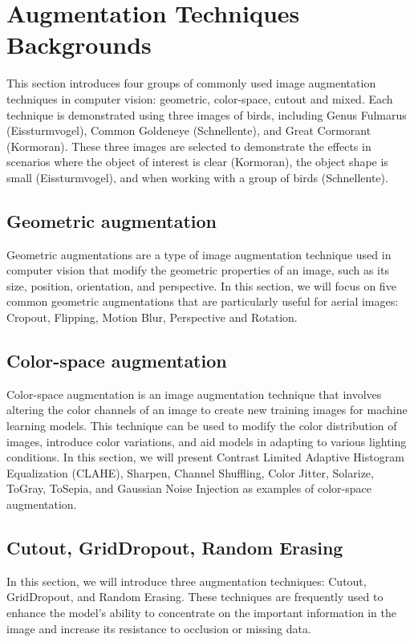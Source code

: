 \section{Augmentation Techniques Backgrounds}\label{Augmentations}

This section introduces four groups of commonly used image augmentation techniques in computer vision: geometric, color-space, cutout and mixed. Each technique is demonstrated using three images of birds, including Genus Fulmarus (Eissturmvogel), Common Goldeneye (Schnellente), and Great Cormorant (Kormoran). These three images are selected to demonstrate the effects in scenarios where the object of interest is clear (Kormoran), the object shape is small (Eissturmvogel), and when working with a group of birds (Schnellente).
\subsection{Geometric augmentation}
Geometric augmentations are a type of image augmentation technique used in computer vision that modify the geometric properties of an image, such as its size, position, orientation, and perspective. In this section, we will focus on five common geometric augmentations that are particularly useful for aerial images: Cropout, Flipping, Motion Blur, Perspective and Rotation. 

\subsection{Color-space augmentation}
Color-space augmentation is an image augmentation technique that involves altering the color channels of an image to create new training images for machine learning models. This technique can be used to modify the color distribution of images, introduce color variations, and aid models in adapting to various lighting conditions. In this section, we will present Contrast Limited Adaptive Histogram Equalization (CLAHE), Sharpen, Channel Shuffling, Color Jitter, Solarize, ToGray, ToSepia, and Gaussian Noise Injection as examples of color-space augmentation.

\subsection{Cutout, GridDropout, Random Erasing}
In this section, we will introduce three augmentation techniques: Cutout, GridDropout, and Random Erasing. These techniques are frequently used to enhance the model's ability to concentrate on the important information in the image and increase its resistance to occlusion or missing data.

